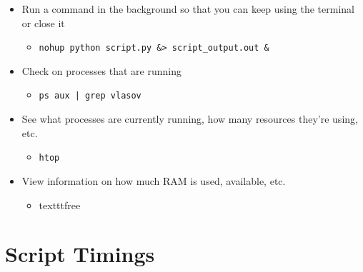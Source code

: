 \documentclass[11pt,a4paper]{report}
\begin{document}
\begin{itemize}

\item Run a command in the background so that you can keep using the terminal or close it
  \begin{itemize}
  \item \texttt{nohup python script.py \&> script\_output.out \&}
  \end{itemize}

\item Check on processes that are running
  \begin{itemize}
  \item \texttt{ps aux | grep vlasov}
  \end{itemize}

\item See what processes are currently running, how many resources they're using, etc.
  \begin{itemize}
  \item \texttt{htop}
  \end{itemize}

\item View information on how much RAM is used, available, etc.
  \begin{itemize}
  \item texttt{free}
  \end{itemize}

\end{itemize}


\section{Script Timings}
\label{sec:script-timings}
\end{document}
